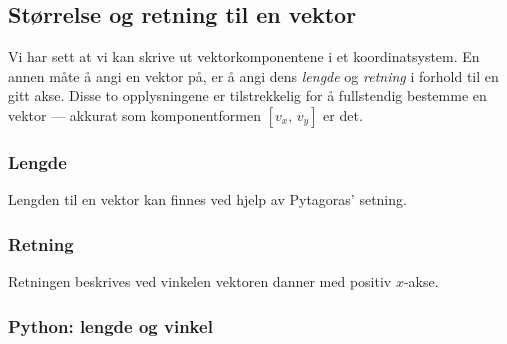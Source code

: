 \subsection{Størrelse og retning til en vektor}

Vi har sett at vi kan skrive ut vektorkomponentene i et koordinatsystem. En annen måte å angi en vektor på, er å angi dens \emph{lengde} og \emph{retning} i forhold til en gitt akse. Disse to opplysningene er tilstrekkelig for å fullstendig bestemme en vektor — akkurat som komponentformen $[v_x,\, v_y]$ er det.

\subsubsection*{Lengde}

Lengden til en vektor kan finnes ved hjelp av Pytagoras’ setning.


\subsubsection*{Retning}

Retningen beskrives ved vinkelen vektoren danner med positiv $x$-akse.



\subsubsection*{Python: lengde og vinkel}

